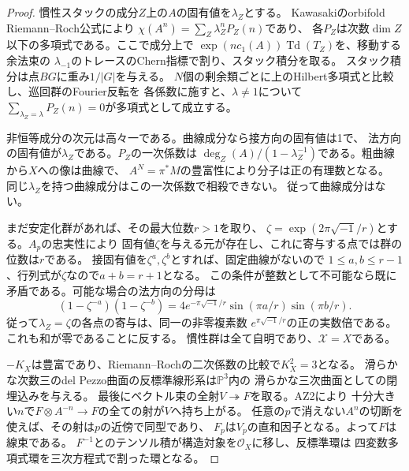 \documentclass[11pt,a4paper]{ltjsarticle}
\theoremstyle{definition}
\begin{document}
\begin{proof}
慣性スタックの成分$Z$上の$A$の固有値を$\lambda_Z$とする。
Kawasakiのorbifold Riemann--Roch公式\cite{Kawasaki1979}により
$\chi(A^n)=\sum_Z \lambda_Z^n P_Z(n)$であり、
各$P_Z$は次数$\dim Z$以下の多項式である。ここで成分上で
$\exp(nc_1(A))\operatorname{Td}(T_Z)$を、移動する余法束の
$\lambda_{-1}$のトレースのChern指標で割り、スタック積分を取る。
スタック積分は点$BG$に重み$1/|G|$を与える。
$N$個の剰余類ごとに上のHilbert多項式と比較し、巡回群のFourier反転を
各係数に施すと、$\lambda\ne1$について
$\sum_{\lambda_Z=\lambda}P_Z(n)=0$が多項式として成立する。

非恒等成分の次元は高々一である。曲線成分なら接方向の固有値は1で、
法方向の固有値が$\lambda_Z$である。$P_Z$の一次係数は
$\deg_Z(A)/(1-\lambda_Z^{-1})$である。粗曲線から$X$への像は曲線で、
$A^N=\pi^*M$の豊富性により分子は正の有理数となる。
同じ$\lambda_Z$を持つ曲線成分はこの一次係数で相殺できない。
従って曲線成分はない。

まだ安定化群があれば、その最大位数$r>1$を取り、
$\zeta=\exp(2\pi\sqrt{-1}/r)$とする。$A_p$の忠実性により
固有値$\zeta$を与える元が存在し、これに寄与する点では群の位数は$r$である。
接固有値を$\zeta^a,\zeta^b$とすれば、固定曲線がないので
$1\le a,b\le r-1$、行列式が$\zeta$なので$a+b=r+1$となる。
この条件が整数として不可能なら既に矛盾である。可能な場合の法方向の分母は
\[
 (1-\zeta^{-a})(1-\zeta^{-b})
 =4e^{-\pi\sqrt{-1}/r}\sin(\pi a/r)\sin(\pi b/r).
\]
従って$\lambda_Z=\zeta$の各点の寄与は、同一の非零複素数
$e^{\pi\sqrt{-1}/r}$の正の実数倍である。これも和が零であることに反する。
慣性群は全て自明であり、$\mathcal X=X$である。

$-K_X$は豊富であり、Riemann--Rochの二次係数の比較で$K_X^2=3$となる。
滑らかな次数三のdel Pezzo曲面の反標準線形系は$\mathbb P^3$内の
滑らかな三次曲面としての閉埋込みを与える。
最後にベクトル束の全射$V\twoheadrightarrow F$を取る。AZ2により
十分大きい$n$で$F\otimes A^{-n}\to F$の全ての射が$V$へ持ち上がる。
任意の$p$で消えない$A^n$の切断を使えば、その射は$p$の近傍で同型であり、
$F_p$は$V_p$の直和因子となる。よって$F$は線束である。
$F^{-1}$とのテンソル積が構造対象を$\mathcal O_X$に移し、反標準環は
四変数多項式環を三次方程式で割った環となる。
\end{proof}
\end{document}
